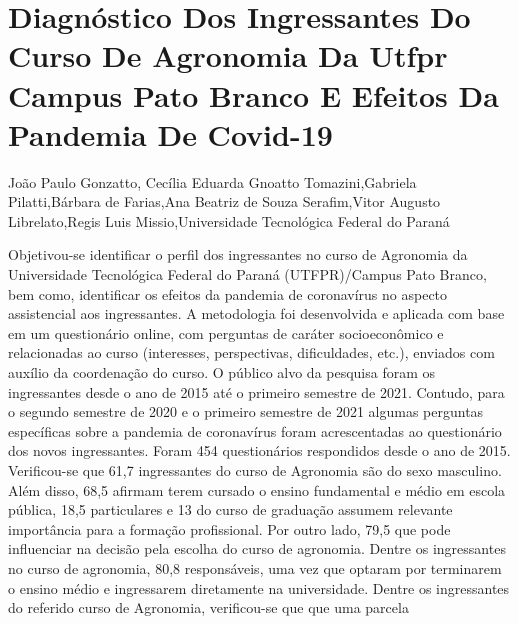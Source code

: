 


\section*{Diagnóstico Dos Ingressantes Do Curso De Agronomia Da Utfpr Campus Pato Branco E Efeitos Da Pandemia De Covid-19}

João Paulo Gonzatto, Cecília Eduarda Gnoatto Tomazini,Gabriela Pilatti,Bárbara de Farias,Ana Beatriz de Souza Serafim,Vitor Augusto Librelato,Regis Luis Missio,Universidade Tecnológica Federal do Paraná

Objetivou-se identificar o perfil dos ingressantes no curso de Agronomia da Universidade
Tecnológica Federal do Paraná (UTFPR)/Campus Pato Branco, bem como, identificar os efeitos
da pandemia de coronavírus no aspecto assistencial aos ingressantes. A metodologia foi
desenvolvida e aplicada com base em um questionário online, com perguntas de caráter
socioeconômico e relacionadas ao curso (interesses, perspectivas, dificuldades, etc.), enviados com
auxílio da coordenação do curso. O público alvo da pesquisa foram os ingressantes desde o ano de
2015 até o primeiro semestre de 2021. Contudo, para o segundo semestre de 2020 e o primeiro
semestre de 2021 algumas perguntas específicas sobre a pandemia de coronavírus foram
acrescentadas ao questionário dos novos ingressantes.
Foram 454 questionários respondidos desde o ano de 2015. Verificou-se que 61,7%
ingressantes do curso de Agronomia são do sexo masculino. Além disso, 68,5%
afirmam terem cursado o ensino fundamental e médio em escola pública, 18,5%
particulares e 13%
do curso de graduação assumem relevante importância para a formação profissional. Por outro
lado, 79,5%
que pode influenciar na decisão pela escolha do curso de agronomia. Dentre os ingressantes no
curso de agronomia, 80,8%
responsáveis, uma vez que optaram por terminarem o ensino médio e ingressarem diretamente na
universidade.
Dentre os ingressantes do referido curso de Agronomia, verificou-se que que uma parcela
